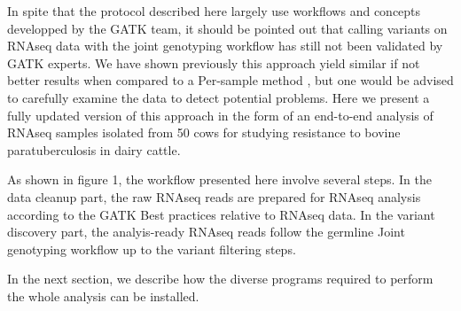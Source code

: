 \documentclass[]{article}
\begin{document}
In spite that the protocol described here largely use workflows and concepts developped by the GATK team, it should be pointed out that calling variants on RNAseq data with the joint genotyping workflow has still not been validated by GATK experts. We have shown previously this approach yield similar if not better results when compared to a Per-sample method \cite{Brouard2019}, but one would be advised to carefully examine the data to detect potential problems. Here we present a fully updated version of this approach in the form of an end-to-end analysis of RNAseq samples isolated from 50 cows for studying resistance to bovine paratuberculosis in dairy cattle.


As shown in figure 1, the workflow presented here involve several steps. In the data cleanup part, the raw RNAseq reads are prepared for RNAseq analysis according to the GATK Best practices relative to RNAseq data. In the variant discovery part, the analyis-ready RNAseq reads follow the germline Joint genotyping workflow up to the variant filtering steps.  

 



In the next section, we describe how the diverse programs required to perform the whole analysis can be installed.







\end{document}
